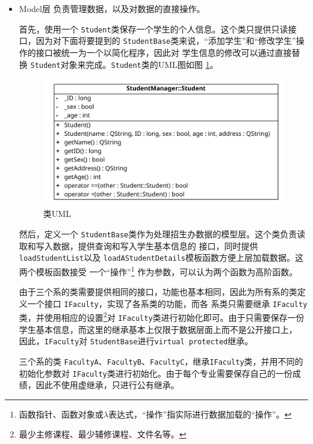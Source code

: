 \documentclass[adobefonts,a4paper]{ctexart}
\begin{document}
\begin{itemize}
 \item Model层
 负责管理数据，以及对数据的直接操作。
 
 首先，使用一个 \verb|Student|类保存一个学生的个人信息。这个类只提供只读接口，因为对下面将要提到的
 \verb|StudentBase|类来说，``添加学生''和``修改学生''操作的接口被统一为一个以简化程序，因此对
 学生信息的修改可以通过直接替换 \verb|Student|对象来完成。\verb|Student|类的UML图如图 \ref{fig:uml_student}。
 
 \begin{figure}[htbp]
  \centering
  \includegraphics[scale=0.8]{Student}
  \caption{\protect{}类UML} \label{fig:uml_student}
 \end{figure}

 然后，定义一个 \verb|StudentBase|类作为处理招生办数据的模型层。这个类负责读取和写入数据，提供查询和写入学生基本信息的
 接口，同时提供 \verb|loadStudentList|以及 \verb|loadAStudentDetails|模板函数方便上层加载数据。这两个模板函数接受
 一个``操作''\footnote{函数指针、函数对象或$\lambda$表达式，``操作''指实际进行数据加载的``操作''。}
 作为参数，可以认为两个函数为高阶函数。
 
 由于三个系的类需要提供相同的接口，功能也基本相同，因此为所有系的类定义一个接口 \verb|IFaculty|，实现了各系类的功能，而各
 系类只需要继承 \verb|IFaculty|类，并使用相应的设置\footnote{最少主修课程、最少辅修课程、文件名等。}对
 \verb|IFaculty|类进行初始化即可。由于只需要保存一份学生基本信息，而这里的继承基本上仅限于数据层面上而不是公开接口上，
 因此，\verb|IFaculty|对 \verb|StudentBase|进行\verb|virtual protected|继承。
 
 三个系的类 \verb|FacultyA|、\verb|FacultyB|、\verb|FacultyC|，继承\verb|IFaculty|类，并用不同的初始化参数对
 \verb|IFaculty|类进行初始化。由于每个专业需要保存自己的一份成绩，因此不使用虚继承，只进行公有继承。
 

\end{itemize}
\end{document}
